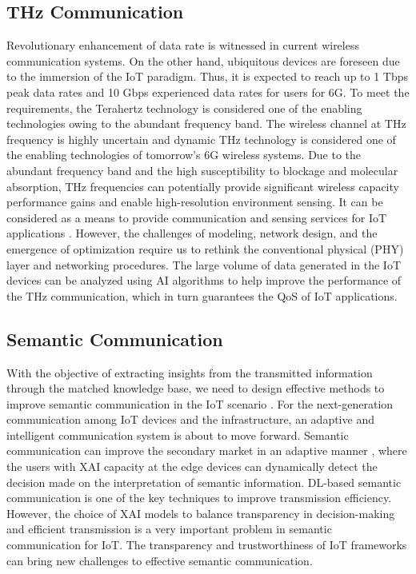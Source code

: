 \documentclass[journal]{IEEEtran}
\begin{document}
\subsection{THz Communication}
Revolutionary enhancement of data rate is witnessed in current wireless communication systems. On the other hand,  ubiquitous devices are foreseen due to the immersion of the IoT paradigm. Thus, it is expected to reach up to 1 Tbps peak data rates and 10 Gbps experienced data rates for users for 6G. To meet the requirements, the Terahertz technology is considered one of the enabling technologies owing to the abundant frequency band. The wireless channel at THz frequency is highly uncertain and dynamic THz technology is considered one of the enabling technologies of tomorrow's 6G wireless systems. Due to the abundant frequency band and the high susceptibility to blockage and molecular absorption, THz frequencies can potentially provide significant wireless capacity performance gains and enable high-resolution environment sensing. It can be considered as a means to provide communication and sensing services for IoT applications \cite{tong2022environment, Tong2021Joint}. However, the challenges of modeling, network design, and the emergence of optimization require us to rethink the conventional physical (PHY) layer and networking procedures. The large volume of data generated in the IoT devices can be analyzed using AI algorithms to help improve the performance of the THz communication, which in turn guarantees the QoS of IoT applications. 


\subsection{Semantic Communication}
With the objective of extracting insights from the transmitted information through the matched knowledge base, we need to design effective methods to improve semantic communication in the IoT scenario \cite{gunduz2022beyond,xu2022edge}. For the next-generation communication among IoT devices and the infrastructure, an adaptive and intelligent communication system is about to move forward. Semantic communication can improve the secondary market in an adaptive manner \cite{tong2021federated,tong2021federated2}, where the users with XAI capacity at the edge devices can dynamically detect the decision made on the interpretation of semantic information. DL-based semantic communication is one of the key techniques to improve transmission efficiency. However, the choice of XAI models to balance transparency in decision-making and efficient transmission is a very important problem in semantic communication for IoT. The transparency and trustworthiness of IoT frameworks can bring new challenges to effective semantic communication. 
\end{document}
